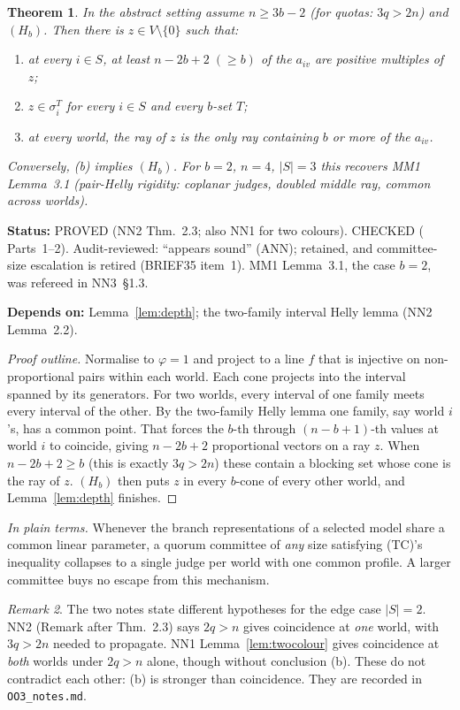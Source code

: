 \documentclass[11pt]{article}
\newtheorem{theorem}{Theorem}[section]
\theoremstyle{definition}
\theoremstyle{remark}
\newtheorem{remark}[theorem]{Remark}
\newcommand{\src}[1]{\textsf{#1}}
\newcommand{\status}[1]{\par\smallskip\noindent\textbf{Status:} #1\par}
\newcommand{\deps}[1]{\noindent\textbf{Depends on:} #1\par}
\newcommand{\inwords}[1]{\noindent\textit{In plain terms.} #1\par\smallskip}
\newcommand{\TC}{\textup{(TC)}}
\begin{document}
\begin{theorem}\label{thm:collapse}
In the abstract setting assume $n\ge3b-2$ (for quotas: $3q>2n$) and $(H_b)$. Then there is $z\in V\setminus\{0\}$ such that:
\begin{enumerate}[label=(\alph*)]
\item at every $i\in S$, at least $n-2b+2\;(\ge b)$ of the $a_{iv}$ are positive multiples of $z$;
\item $z\in\sigma_i^T$ for every $i\in S$ and every $b$-set $T$;
\item at every world, the ray of $z$ is the only ray containing $b$ or more of the $a_{iv}$.
\end{enumerate}
Conversely, (b) implies $(H_b)$. For $b=2$, $n=4$, $|S|=3$ this recovers \src{MM1} Lemma~3.1 (pair-Helly rigidity: coplanar judges, doubled middle ray, common across worlds).
\end{theorem}
\status{PROVED (\src{NN2} Thm.~2.3; also \src{NN1} for two colours). CHECKED (\file{nn2py/collapse_check.out} Parts~1--2). Audit-reviewed: ``appears sound'' (\src{ANN}); retained, and committee-size escalation is retired (\src{BRIEF35} item~1). \src{MM1} Lemma~3.1, the case $b=2$, was refereed in \src{NN3}~\S1.3.}
\deps{Lemma~\ref{lem:depth}; the two-family interval Helly lemma (\src{NN2} Lemma~2.2).}

\begin{proof}[Proof outline]
Normalise to $\varphi=1$ and project to a line $f$ that is injective on non-proportional pairs within each world. Each cone projects into the interval spanned by its generators. For two worlds, every interval of one family meets every interval of the other. By the two-family Helly lemma one family, say world $i$'s, has a common point. That forces the $b$-th through $(n-b+1)$-th values at world $i$ to coincide, giving $n-2b+2$ proportional vectors on a ray $z$. When $n-2b+2\ge b$ (this is exactly $3q>2n$) these contain a blocking set whose cone is the ray of $z$. $(H_b)$ then puts $z$ in every $b$-cone of every other world, and Lemma~\ref{lem:depth} finishes.
\end{proof}
\inwords{Whenever the branch representations of a selected model share a common linear parameter, a quorum committee of \emph{any} size satisfying \TC's inequality collapses to a single judge per world with one common profile. A larger committee buys no escape from this mechanism.}

\begin{remark}\label{rem:collapse-hyp}
The two notes state different hypotheses for the edge case $|S|=2$. \src{NN2} (Remark after Thm.~2.3) says $2q>n$ gives coincidence at \emph{one} world, with $3q>2n$ needed to propagate. \src{NN1} Lemma~\ref{lem:twocolour} gives coincidence at \emph{both} worlds under $2q>n$ alone, though without conclusion (b). These do not contradict each other: (b) is stronger than coincidence. They are recorded in \texttt{OO3\_notes.md}.
\end{remark}
\end{document}
